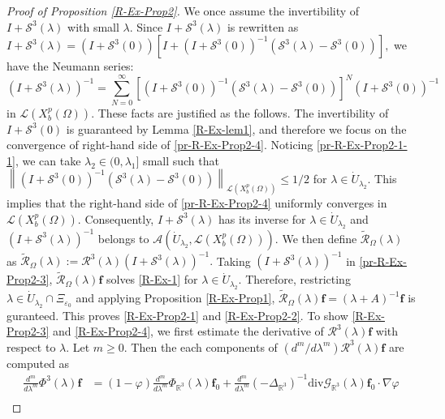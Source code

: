 \documentclass[dvipdfmx,12pt]{article}
\begin{document}
\begin{proof}[Proof of Proposition \ref{R-Ex-Prop2}]
We once assume the invertibility of $I+\mathcal{S}^3(\lambda)$ with small $\lambda$. Since $I+\mathcal{S}^3(\lambda)$ is rewritten as
$I+\mathcal{S}^3(\lambda)=(I+\mathcal{S}^3(0))\left[I+(I+\mathcal{S}^3(0))^{-1}(\mathcal{S}^3(\lambda)-\mathcal{S}^3(0))\right],$ we have the Neumann series:
\begin{equation}\label{pr-R-Ex-Prop2-4}
(I+\mathcal{S}^3(\lambda))^{-1}=\sum_{N=0}^\infty \left[(I+\mathcal{S}^3(0))^{-1} (\mathcal{S}^3(\lambda)-\mathcal{S}^3(0))\right]^N(I+\mathcal{S}^3(0))^{-1}
\end{equation}
in $\mathcal{L}(X_b^p(\Omega))$.
These facts are justified as the follows. The invertibility of $I+\mathcal{S}^3(0)$ is guaranteed by Lemma \ref{R-Ex-lem1}, and therefore we focus on the convergence of right-hand side of \eqref{pr-R-Ex-Prop2-4}. Noticing \eqref{pr-R-Ex-Prop2-1-1}, we can take $\lambda_2\in (0,\lambda_1]$ small such that
$
\left\| (I+\mathcal{S}^3(0))^{-1} (\mathcal{S}^3(\lambda)-\mathcal{S}^3(0))\right\|_{\mathcal{L}(X_b^p(\Omega))} \le 1/2$ for $\lambda\in \dot{U}_{\lambda_2}.
$
This implies that the right-hand side of \eqref{pr-R-Ex-Prop2-4} uniformly converges in $\mathcal{L}(X_b^p(\Omega))$. Consequently, $I+\mathcal{S}^3(\lambda)$ has its inverse for $\lambda\in \dot{U}_{\lambda_2}$ and $(I+\mathcal{S}^3(\lambda))^{-1}$ belongs to $ \mathcal{A}(\Dot{U}_{\lambda_2},\mathcal{L}(X_b^p(\Omega))).$
We then define $\widetilde{\mathcal{R}}_{\Omega}(\lambda)$ as
$
\widetilde{\mathcal{R}}_{\Omega}(\lambda):=\mathcal{R}^3(\lambda)(I+\mathcal{S}^3(\lambda))^{-1}.
$
Taking $(I+\mathcal{S}^3(\lambda))^{-1}$ in \eqref{pr-R-Ex-Prop2-3}, $\widetilde{\mathcal{R}}_{\Omega}(\lambda)\mathbf{f}$ solves \eqref{R-Ex-1} for $\lambda\in \dot{U}_{\lambda_2}$. Therefore, restricting $\lambda\in \dot{U}_{\lambda_2}\cap \Xi_{\varepsilon_0}$ and applying Proposition \ref{R-Ex-Prop1}, $\widetilde{\mathcal{R}}_{\Omega}(\lambda)\mathbf{f}=(\lambda+A)^{-1}\mathbf{f}$ is guranteed. This proves \eqref{R-Ex-Prop2-1} and \eqref{R-Ex-Prop2-2}. To show \eqref{R-Ex-Prop2-3} and \eqref{R-Ex-Prop2-4}, we first estimate the derivative of $\mathcal{R}^3(\lambda)\mathbf{f}$ with respect to $\lambda$. Let $m\ge 0$. Then the each components of $(d^m/d\lambda^m)\mathcal{R}^3(\lambda)\mathbf{f}$ are computed as
\begin{align*}
\frac{d^m}{d\lambda^m}\Phi^3(\lambda)\mathbf{f}&=(1-\varphi)\frac{d^m}{d\lambda^m}\Phi_{\mathbb{R}^3}(\lambda)\mathbf{f}_0+\frac{d^m}{d\lambda^m}(-\Delta_{\mathbb{R}^3})^{-1}\mathrm{div}\mathcal{G}_{\mathbb{R}^3}(\lambda)\mathbf{f}_0\cdot \nabla\varphi\\

\end{align*}
\end{proof}
\end{document}
